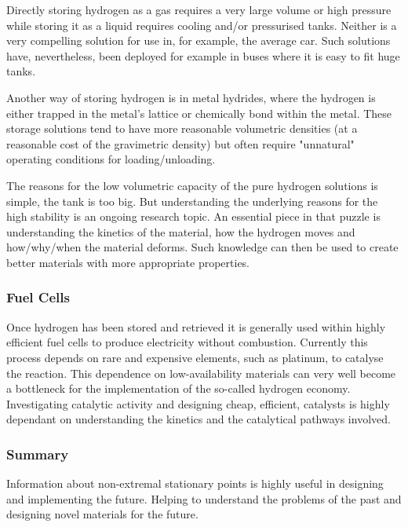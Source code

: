 Directly storing hydrogen as a gas requires a very large volume or high pressure while storing it as a liquid requires cooling and/or pressurised tanks.
Neither is a very compelling solution for use in, for example, the average car.
Such solutions have, nevertheless, been deployed for example in buses where it is easy to fit huge tanks. %

Another way of storing hydrogen is in metal hydrides, where the hydrogen is either trapped in the metal's lattice or chemically bond within the metal.
These storage solutions tend to have more reasonable volumetric densities (at a reasonable cost of the gravimetric density)  but often require "unnatural" operating conditions for loading/unloading.

The reasons for the low volumetric capacity of the pure hydrogen solutions is simple, the tank is too big.
But understanding the underlying reasons for the high stability is an ongoing research topic.
An essential piece in that puzzle is understanding the kinetics of the material, how the hydrogen moves and how/why/when the material deforms.
Such knowledge can then be used to create better materials with more appropriate properties.

\subsubsection{Fuel Cells}
Once hydrogen has been stored and retrieved it is generally used within highly efficient fuel cells to produce electricity without combustion. %
Currently this process depends on rare and expensive elements, such as platinum, to catalyse the reaction.
This dependence on low-availability materials can very well become a bottleneck for the implementation of the so-called hydrogen economy.
Investigating catalytic activity and designing cheap, efficient, catalysts is highly dependant on understanding the kinetics and the catalytical pathways involved.

\subsubsection{Summary}
Information about non-extremal stationary points is highly useful in designing and implementing the future.
Helping to understand the problems of the past and designing novel materials for the future.




